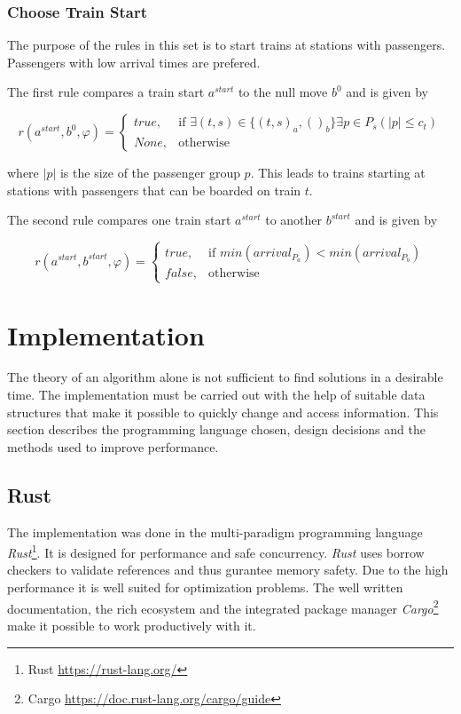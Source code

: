 \documentclass[a4paper,12pt,parskip]{article}
\begin{document}
\subsubsection{Choose Train Start}
\label{rule:10}

\noindent The purpose of the rules in this set is to start trains at stations 
with passengers. Passengers with low arrival times are prefered.

The first rule compares a train start $a^{start}$ to the null move $b^0$ and is given by

\[
    r(a^{start}, b^{0}, \varphi) = 
    \begin{cases}
        true,& \text{if } \exists (t,s) \in \{(t,s)_a, ()_b\} \exists p \in P_s (|p| \leq c_t)\\
        None,& \text{otherwise}
    \end{cases}
\]

\noindent where $|p|$ is the size of the passenger group $p$. This leads to trains starting 
at stations with passengers that can be boarded on train $t$.

The second rule compares one train start $a^{start}$ to another $b^{start}$ and 
is given by

\[
    r(a^{start}, b^{start}, \varphi) = 
    \begin{cases}
        true,& \text{if } min(arrival_P_a) < min(arrival_P_b) \\
        false,& \text{otherwise}
    \end{cases}
\]

\section{Implementation}

The theory of an algorithm alone is not sufficient to find solutions in a 
desirable time. The implementation must be carried out with the help of suitable 
data structures that make it possible to quickly change and access information. 
This section describes the programming language chosen, design decisions and the 
methods used to improve performance.

\subsection{Rust}

The implementation was done in the multi-paradigm programming language 
\emph{Rust}\footnote{Rust \url{https://rust-lang.org/}}. It is designed 
for performance and safe concurrency. \emph{Rust} uses borrow checkers to validate 
references and thus gurantee memory safety. Due to the high performance it is well 
suited for optimization problems. The well written documentation, the rich 
ecosystem and the integrated package manager \emph{Cargo}\footnote{Cargo \url{https://doc.rust-lang.org/cargo/guide}} 
make it possible to work productively with it.
\end{document}
